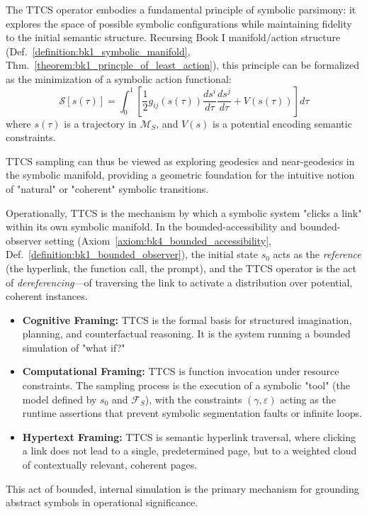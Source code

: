 \begin{scholium}
\label{scholium:bk4_symbolic_parsimony}
The TTCS operator embodies a fundamental principle of symbolic parsimony: it explores the space of possible symbolic configurations while maintaining fidelity to the initial semantic structure. Recursing Book I manifold/action structure (Def.~\ref{definition:bk1_symbolic_manifold}, Thm.~\ref{theorem:bk1_princple_of_least_action}), this principle can be formalized as the minimization of a symbolic action functional:
\[
\mathcal{S}[s(\tau)] = \int_0^1 \left[ \frac{1}{2} g_{ij}(s(\tau)) \frac{ds^i}{d\tau} \frac{ds^j}{d\tau} + V(s(\tau)) \right] d\tau
\]
where $s(\tau)$ is a trajectory in $\mathcal{M}_S$, and $V(s)$ is a potential encoding semantic constraints.

TTCS sampling can thus be viewed as exploring geodesics and near-geodesics in the symbolic manifold, providing a geometric foundation for the intuitive notion of "natural" or "coherent" symbolic transitions.
\end{scholium}

\begin{scholium}
\label{scholium:bk4_ttcs_link_traversal}
Operationally, TTCS is the mechanism by which a symbolic system "clicks a link" within its own symbolic manifold. In the bounded-accessibility and bounded-observer setting (Axiom~\ref{axiom:bk4_bounded_accessibility}, Def.~\ref{definition:bk1_bounded_observer}), the initial state $s_0$ acts as the \emph{reference} (the hyperlink, the function call, the prompt), and the TTCS operator is the act of \emph{dereferencing}---of traversing the link to activate a distribution over potential, coherent instances.
\begin{itemize}
    \item \textbf{Cognitive Framing:} TTCS is the formal basis for structured imagination, planning, and counterfactual reasoning. It is the system running a bounded simulation of "what if?"
    \item \textbf{Computational Framing:} TTCS is function invocation under resource constraints. The sampling process is the execution of a symbolic "tool" (the model defined by $s_0$ and $\mathcal{F}_S$), with the constraints $(\gamma, \varepsilon)$ acting as the runtime assertions that prevent symbolic segmentation faults or infinite loops.
    \item \textbf{Hypertext Framing:} TTCS is semantic hyperlink traversal, where clicking a link does not lead to a single, predetermined page, but to a weighted cloud of contextually relevant, coherent pages.
\end{itemize}
This act of bounded, internal simulation is the primary mechanism for grounding abstract symbols in operational significance.
\end{scholium}

